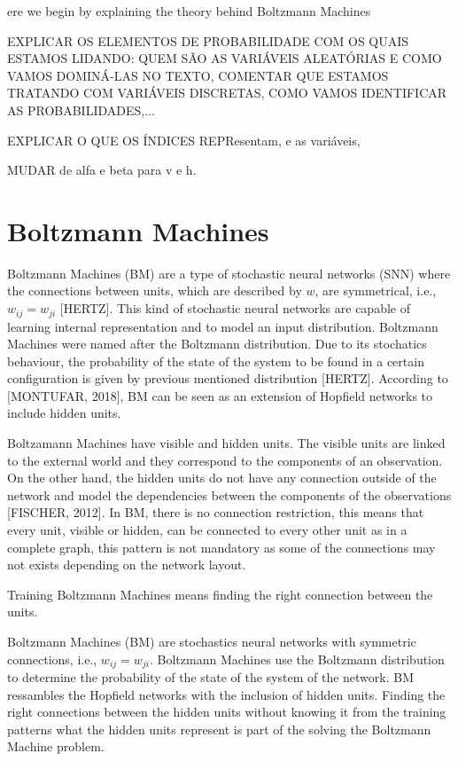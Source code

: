 ere we begin by explaining the theory behind Boltzmann Machines

EXPLICAR OS ELEMENTOS DE PROBABILIDADE COM OS QUAIS ESTAMOS LIDANDO:%
QUEM S\~{A}O AS VARI\'{A}VEIS ALEAT\'{O}RIAS E COMO VAMOS DOMIN\'{A}-LAS NO TEXTO, 
COMENTAR QUE ESTAMOS TRATANDO COM VARI\'{A}VEIS DISCRETAS, COMO VAMOS IDENTIFICAR AS PROBABILIDADES,$\ldots$

EXPLICAR O QUE OS \'{I}NDICES REPResentam, e as vari\'{a}veis,

MUDAR de alfa e beta para v e h.

\section{Boltzmann Machines}

Boltzmann Machines (BM) are a type of stochastic neural networks (SNN) where the connections between units, which are described by $w$, are symmetrical, i.e., $w_{ij} = w_{ji}$ [HERTZ]. 
This kind of stochastic neural networks are capable of learning internal representation and to model an input distribution. 
Boltzmann Machines were named after the Boltzmann distribution. 
Due to its stochatics behaviour, the probability of the state of the system to be found in a certain configuration is given by previous mentioned distribution [HERTZ]. 
According to [MONTUFAR, 2018], BM can be seen as an extension of Hopfield networks to include hidden units.


Boltzamann Machines have visible and hidden units. 
The visible units are linked to the external world and they correspond to the components of an observation. On the other hand, the hidden units do not have any connection outside of the network and model the dependencies between the components of the observations [FISCHER, 2012]. 
In BM, there is no connection restriction, this means that every unit, visible or hidden, can be connected to every other unit as in a complete graph, this pattern is not mandatory as some of the connections may not exists depending on the network layout.

Training Boltzmann Machines means finding the right connection between the units.

Boltzmann Machines (BM) are stochastics neural networks with symmetric connections, i.e., $w_{ij} = w_{ji}$. 
Boltzmann Machines use the Boltzmann distribution to determine the probability of the state of the system of the network. 
BM ressambles the Hopfield networks with the inclusion of hidden units. 
Finding the right connections between the hidden units without knowing it from the training patterns what the hidden units represent is part of the solving the Boltzmann Machine problem.

